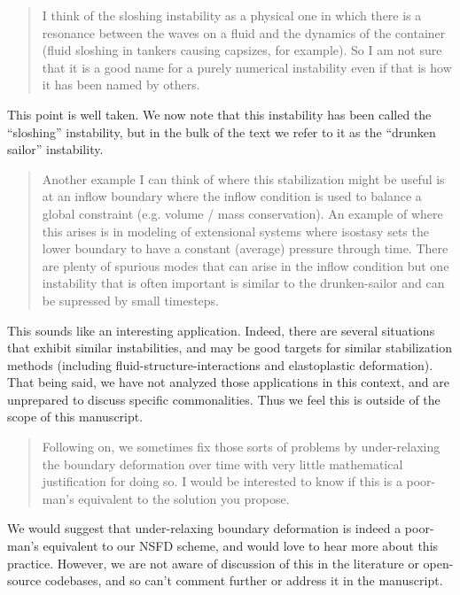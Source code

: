 \documentclass[a4paper,12pt]{article}
\begin{document}
\begin{quotation}
I think of the sloshing instability as a physical one in which there is a resonance between the waves on a fluid and the dynamics of the container (fluid sloshing in tankers causing capsizes, for example). So I am not sure that it is a good name for a purely numerical instability even if that is how it has been named by others.
\end{quotation}

This point is well taken. We now note that this instability has been called the ``sloshing'' instability,
but in the bulk of the text we refer to it as the ``drunken sailor'' instability.

\begin{quotation}
Another example I can think of where this stabilization might be useful is at an inflow boundary where the inflow condition is used to balance a global constraint (e.g. volume / mass conservation). An example of where this arises is in modeling of extensional systems where isostasy sets the lower boundary to have a constant (average) pressure through time. There are plenty of spurious modes that can arise in the inflow condition but one instability that is often important is similar to the drunken-sailor and can be supressed by small timesteps.
\end{quotation}
This sounds like an interesting application.
Indeed, there are several situations that exhibit similar instabilities, 
and may be good targets for similar stabilization methods 
(including fluid-structure-interactions and elastoplastic deformation).
That being said, we have not analyzed those applications in this context,
and are unprepared to discuss specific commonalities.
Thus we feel this is outside of the scope of this manuscript.


\begin{quotation}
Following on, we sometimes fix those sorts of problems by under-relaxing the boundary deformation over time with very little mathematical justification for doing so. I would be interested to know if this is a poor-man's equivalent to the solution you propose.
\end{quotation}

We would suggest that under-relaxing boundary deformation is indeed a poor-man's equivalent to our NSFD scheme,
and would love to hear more about this practice.
However, we are not aware of discussion of this in the literature or open-source codebases, and so can't comment further or address it in the manuscript.
\end{document}
